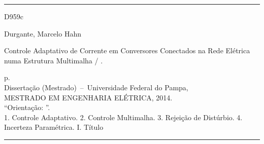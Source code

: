 
\vspace*{\fill}					%
\hrule							%
	\begin{minipage}[t]{0.1\textwidth}
		D959c
		\vspace*{\fill}%
	\end{minipage}
	\begin{minipage}[t]{0.7\textwidth}
		Durgante, Marcelo Hahn

		\hspace{0.46cm} Controle Adaptativo de Corrente em Conversores Conectados na Rede Elétrica numa
		Estrutura Multimalha / \imprimirautor.

		\hspace{0.46cm} \pageref{LastPage} p.\\

		\hspace{0.46cm} Dissertação (Mestrado)~--~Universidade Federal do Pampa,\\
		MESTRADO EM ENGENHARIA ELÉTRICA, 2014.\\

		\hspace{0.46cm} ``Orientação: \imprimirorientador''.\\

		\hspace{0.46cm}
			1. Controle Adaptativo.
			2. Controle Multimalha.
			3. Rejeição de Distúrbio.
			4. Incerteza Paramétrica.
			I. Título\\
	\end{minipage}
\hrule
